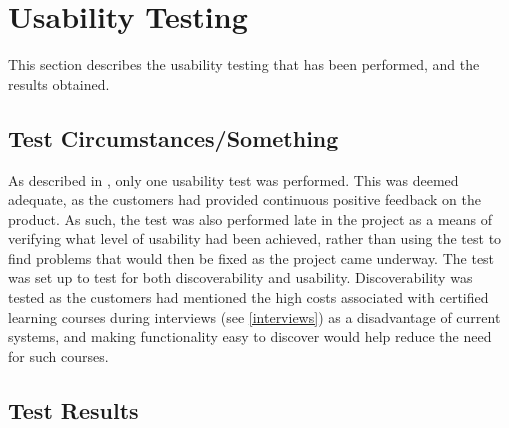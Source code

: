 \section{Usability Testing}
This section describes the usability testing that has been performed, and the results obtained. 

\subsection{Test Circumstances/Something}
As described in , only one usability test was performed. 
This was deemed adequate, as the customers had provided continuous positive feedback on the product. 
As such, the test was also performed late in the project as a means of verifying what level of usability had been achieved, rather than using the test to find problems that would then be fixed as the project came underway. \newline
The test was set up to test for both discoverability and usability. 
Discoverability was tested as the customers had mentioned the high costs associated with certified learning courses during interviews (see \autoref{interviews}) as a disadvantage of current systems, and making functionality easy to discover would help reduce the need for such courses.

\subsection{Test Results}
